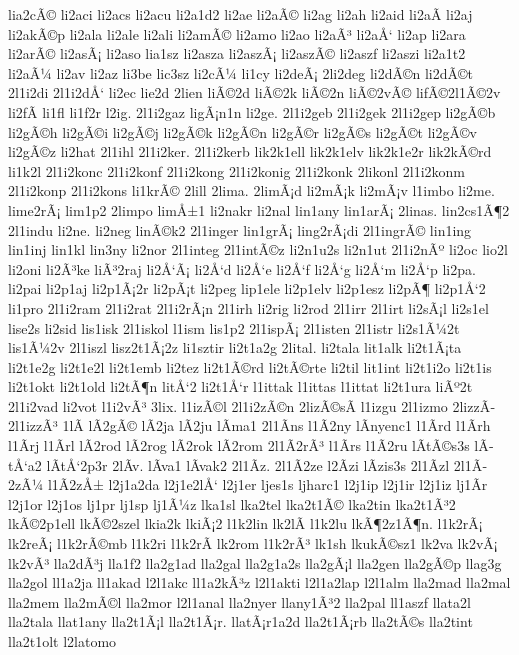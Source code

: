 {lia2cÃ©
li2aci
li2acs
li2acu
li2a1d2
li2ae
li2aÃ©
li2ag
li2ah
li2aid
li2aÃ­
li2aj
li2akÃ©p
li2ala
li2ale
li2ali
li2amÃ©
li2amo
li2ao
li2aÃ³
li2aÅ‘
li2ap
li2ara
li2arÃ©
li2asÃ¡
li2aso
lia1sz
li2asza
li2aszÃ¡
li2aszÃ©
li2aszf
li2aszi
li2a1t2
li2aÃ¼
li2av
li2az
li3be
lic3sz
li2cÃ¼
li1cy
li2deÃ¡
2li2deg
li2dÃ©n
li2dÃ©t
2l1i2di
2l1i2dÅ‘
li2ec
lie2d
2lien
liÃ©2d
liÃ©2k
liÃ©2n
liÃ©2vÃ©
lifÃ©2l1Ã©2v
li2fÃ­
li1fl
li1f2r
l2ig.
2l1i2gaz
ligÃ¡n1n
li2ge.
2l1i2geb
2l1i2gek
2l1i2gep
li2gÃ©b
li2gÃ©h
li2gÃ©i
li2gÃ©j
li2gÃ©k
li2gÃ©n
li2gÃ©r
li2gÃ©s
li2gÃ©t
li2gÃ©v
li2gÃ©z
li2hat
2l1ihl
2l1i2ker.
2l1i2kerb
lik2k1ell
lik2k1elv
lik2k1e2r
lik2kÃ©rd
li1k2l
2l1i2konc
2l1i2konf
2l1i2kong
2l1i2konig
2l1i2konk
2likonl
2l1i2konm
2l1i2konp
2l1i2kons
li1krÃ©
2lill
2lima.
2limÃ¡d
li2mÃ¡k
li2mÃ¡v
l1imbo
li2me.
lime2rÃ¡
lim1p2
2limpo
limÅ±1
li2nakr
li2nal
lin1any
lin1arÃ¡
2linas.
lin2cs1Ã¶2
2l1indu
li2ne.
li2neg
linÃ©k2
2l1inger
lin1grÃ¡
ling2rÃ¡di
2l1ingrÃ©
lin1ing
lin1inj
lin1kl
lin3ny
li2nor
2l1integ
2l1intÃ©z
li2n1u2s
li2n1ut
2l1i2nÃº
li2oc
lio2l
li2oni
li2Ã³ke
liÃ³2raj
li2Å‘Ã¡
li2Å‘d
li2Å‘e
li2Å‘f
li2Å‘g
li2Å‘m
li2Å‘p
li2pa.
li2pai
li2p1aj
li2p1Ã¡2r
li2pÃ¡t
li2peg
lip1ele
li2p1elv
li2p1esz
li2pÃ¶
li2p1Å‘2
li1pro
2l1i2ram
2l1i2rat
2l1i2rÃ¡n
2l1irh
li2rig
li2rod
2l1irr
2l1irt
li2sÃ¡l
li2s1el
lise2s
li2sid
lis1isk
2l1iskol
l1ism
lis1p2
2l1ispÃ¡
2l1isten
2l1istr
li2s1Ã¼2t
lis1Ã¼2v
2l1iszl
lisz2t1Ã¡2z
li1sztir
li2t1a2g
2lital.
li2tala
lit1alk
li2t1Ã¡ta
li2t1e2g
li2t1e2l
li2t1emb
li2tez
li2t1Ã©rd
li2tÃ©rte
li2til
lit1int
li2t1i2o
li2t1is
li2t1okt
li2t1old
li2tÃ¶n
litÅ‘2
li2t1Å‘r
l1ittak
l1ittas
l1ittat
li2t1ura
liÃº2t
2l1i2vad
li2vot
l1i2vÃ³
3lix.
l1izÃ©l
2l1i2zÃ©n
2lizÃ©sÃ­
l1izgu
2l1izmo
2lizzÃ­
2l1izzÃ³
1lÃ­
lÃ­2gÃ©
lÃ­2ja
lÃ­2ju
lÃ­ma1
2l1Ã­ns
l1Ã­2ny
lÃ­nyenc1
l1Ã­rd
l1Ã­rh
l1Ã­rj
l1Ã­rl
lÃ­2rod
lÃ­2rog
lÃ­2rok
lÃ­2rom
2l1Ã­2rÃ³
l1Ã­rs
l1Ã­2ru
lÃ­tÃ©s3s
lÃ­tÅ‘a2
lÃ­tÅ‘2p3r
2lÃ­v.
lÃ­va1
lÃ­vak2
2l1Ã­z.
2l1Ã­2ze
l2Ã­zi
lÃ­zis3s
2l1Ã­zl
2l1Ã­2zÃ¼
l1Ã­2zÅ±
l2j1a2da
l2j1e2lÅ‘
l2j1er
ljes1s
ljharc1
l2j1ip
l2j1ir
l2j1iz
lj1Ã­r
l2j1or
l2j1os
lj1pr
lj1sp
lj1Ã¼z
lka1sl
lka2tel
lka2t1Ã©
lka2tin
lka2t1Ã³2
lkÃ©2p1ell
lkÃ©2szel
lkia2k
lkiÃ¡2
l1k2lin
lk2lÃ­
l1k2lu
lkÃ¶2z1Ã¶n.
l1k2rÃ¡
lk2reÃ¡
l1k2rÃ©mb
l1k2ri
l1k2rÃ­
lk2rom
l1k2rÃ³
lk1sh
lkukÃ©sz1
lk2va
lk2vÃ¡
lk2vÃ³
lla2dÃ³j
lla1f2
lla2g1ad
lla2gal
lla2g1a2s
lla2gÃ¡l
lla2gen
lla2gÃ©p
llag3g
lla2gol
ll1a2ja
ll1akad
l2l1akc
ll1a2kÃ³z
l2l1akti
l2l1a2lap
l2l1alm
lla2mad
lla2mal
lla2mem
lla2mÃ©l
lla2mor
l2l1anal
lla2nyer
llany1Ã³2
lla2pal
ll1aszf
llata2l
lla2tala
llat1any
lla2t1Ã¡l
lla2t1Ã¡r.
llatÃ¡r1a2d
lla2t1Ã¡rb
lla2tÃ©s
lla2tint
lla2t1olt
l2latomo
}
